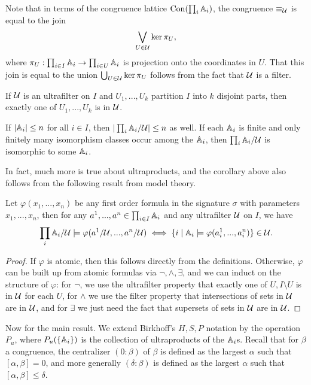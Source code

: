 \begin{appendices}
Note that in terms of the congruence lattice $\operatorname{Con}(\prod_i \mathbb{A}_i)$, the congruence $\equiv_{\mathcal{U}}$ is equal to the join
\[
\bigvee_{U \in \mathcal{U}} \ker \pi_U,
\]
where $\pi_U : \prod_{i\in I} \mathbb{A}_i \rightarrow \prod_{i \in U} \mathbb{A}_i$ is projection onto the coordinates in $U$. That this join is equal to the union $\bigcup_{U \in \mathcal{U}} \ker \pi_U$ follows from the fact that $\mathcal{U}$ is a filter.

\begin{prop} If $\mathcal{U}$ is an ultrafilter on $I$ and $U_1, ..., U_k$ partition $I$ into $k$ disjoint parts, then exactly one of $U_1, ..., U_k$ is in $\mathcal{U}$.
\end{prop}

\begin{cor}\label{ultraproduct-finite} If $|\mathbb{A}_i| \le n$ for all $i \in I$, then $|\prod_i \mathbb{A}_i/\mathcal{U}| \le n$ as well. If each $\mathbb{A}_i$ is finite and only finitely many isomorphism classes occur among the $\mathbb{A}_i$, then $\prod_i \mathbb{A}_i/\mathcal{U}$ is isomorphic to some $\mathbb{A}_i$.
\end{cor}

In fact, much more is true about ultraproducts, and the corollary above also follows from the following result from model theory.

\begin{thm}[{\L}o\'s's Theorem] Let $\varphi(x_1, ..., x_n)$ be any first order formula in the signature $\sigma$ with parameters $x_1, ..., x_n$, then for any $a^1, ..., a^n \in \prod_{i \in I} \mathbb{A}_i$ and any ultrafilter $\mathcal{U}$ on $I$, we have
\[
\prod_i \mathbb{A}_i/\mathcal{U} \models \varphi(a^1/\mathcal{U}, ..., a^n/\mathcal{U}) \iff \{i \mid \mathbb{A}_i \models \varphi(a^1_i, ..., a^n_i)\} \in \mathcal{U}.
\]
\end{thm}
\begin{proof} If $\varphi$ is atomic, then this follows directly from the definitions. Otherwise, $\varphi$ can be built up from atomic formulas via $\neg, \wedge, \exists$, and we can induct on the structure of $\varphi$: for $\neg$, we use the ultrafilter property that exactly one of $U, I\setminus U$ is in $\mathcal{U}$ for each $U$, for $\wedge$ we use the filter property that intersections of sets in $\mathcal{U}$ are in $\mathcal{U}$, and for $\exists$ we just need the fact that supersets of sets in $\mathcal{U}$ are in $\mathcal{U}$.
\end{proof}

Now for the main result. We extend Birkhoff's $H,S,P$ notation by the operation $P_u$, where $P_u(\{\mathbb{A}_i\})$ is the collection of ultraproducts of the $\mathbb{A}_i$s. Recall that for $\beta$ a congruence, the centralizer $(0:\beta)$ of $\beta$ is defined as the largest $\alpha$ such that $[\alpha,\beta] = 0$, and more generally $(\delta:\beta)$ is defined as the largest $\alpha$ such that $[\alpha,\beta] \le \delta$.


\end{appendices}
